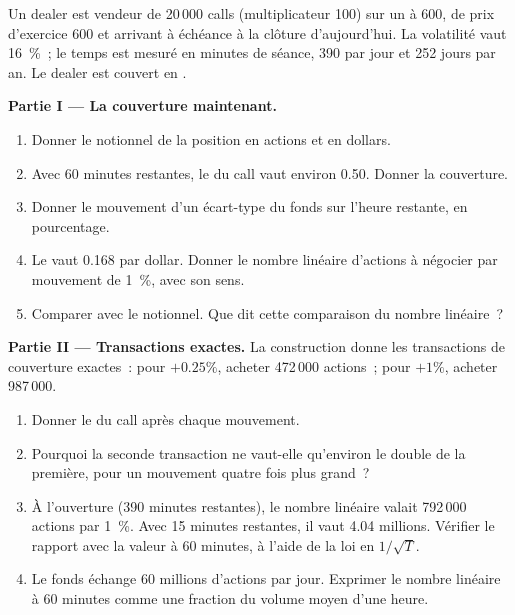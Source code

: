 \begin{problem}\label{pb:m1:zero-day-options-and-retail-flow:1}
Un dealer est vendeur de 20\,000 calls (multiplicateur 100) sur un 
à 600, de prix d'exercice 600 et arrivant à échéance à la clôture d'aujourd'hui. La volatilité vaut 16~\%~; le temps est
mesuré en minutes de séance, 390 par jour et 252 jours par an. Le dealer
est couvert en .

\medskip\noindent\textbf{Partie I --- La couverture maintenant.}
\begin{enumerate}
\item Donner le notionnel de la position en actions et en dollars.
\item Avec 60 minutes restantes, le  du call vaut environ 0.50. Donner la couverture.
\item Donner le mouvement d'un écart-type du fonds sur l'heure restante,
en pourcentage.
\item Le  vaut 0.168 par dollar. Donner le nombre linéaire d'actions à négocier
par mouvement de 1~\%, avec son sens.
\item Comparer avec le notionnel. Que dit cette comparaison du
nombre linéaire~?
\end{enumerate}

\medskip\noindent\textbf{Partie II --- Transactions exactes.}
La construction donne les transactions de couverture exactes~: pour $+0.25\%$, acheter 472\,000 actions~; pour
$+1\%$, acheter 987\,000.
\begin{enumerate}[resume]
\item Donner le  du call après chaque mouvement.
\item Pourquoi la seconde transaction ne vaut-elle qu'environ le double de la première, pour un mouvement
quatre fois plus grand~?
\item À l'ouverture (390 minutes restantes), le nombre linéaire valait 792\,000 actions
par 1~\%. Avec 15 minutes restantes, il vaut 4.04 millions. Vérifier le rapport avec la valeur
à 60 minutes, à l'aide de la loi en $1/\sqrt T$.
\item Le fonds échange 60 millions d'actions par jour. Exprimer le nombre linéaire à 60 minutes
comme une fraction du volume moyen d'une heure.
\end{enumerate}


\end{problem}
